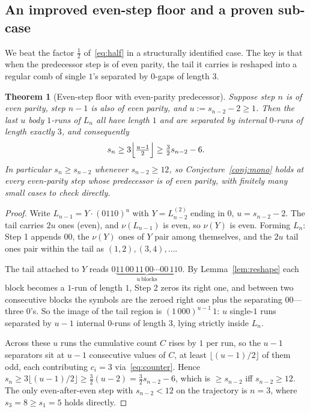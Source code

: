 \documentclass[11pt,reqno]{amsart}
\theoremstyle{plain}
\newtheorem{thm}[theorem]{Theorem}
\theoremstyle{definition}
\theoremstyle{remark}
\begin{document}
\subsection{An improved even-step floor and a proven sub-case}\label{sec:7.1}
We beat the factor $\tfrac12$ of~\eqref{eq:half} in a structurally identified case. The key is that when the predecessor step is of even parity, the tail it carries is reshaped into a regular comb of single $1$'s separated by $0$-gaps of length $3$.

\begin{thm}[Even-step floor with even-parity predecessor]\label{thm:floor}
Suppose step $n$ is of even parity, step $n-1$ is also of even parity, and $u:=s_{n-2}-2\ge 1$. Then the last $u$ body $1$-runs of $L_n$ all have length $1$ and are separated by internal $0$-runs of length exactly $3$, and consequently
\begin{equation}\label{eq:floor}
s_n\ge 3\Bigl\lfloor\tfrac{u-1}{2}\Bigr\rfloor\ge\tfrac32 s_{n-2}-6.
\end{equation}
In particular $s_n\ge s_{n-2}$ whenever $s_{n-2}\ge 12$, so Conjecture~\ref{conj:mono} holds at every even-parity step whose predecessor is of even parity, with finitely many small cases to check directly.
\end{thm}
\begin{proof}
Write $L_{n-1}=Y\cdot(0110)^u$ with $Y=L^{(2)}_{n-2}$ ending in $0$, $u=s_{n-2}-2$. The tail carries $2u$ ones (even), and $\nu(L_{n-1})$ is even, so $\nu(Y)$ is even. Forming $L_n$: Step 1 appends $00$, the $\nu(Y)$ ones of $Y$ pair among themselves, and the $2u$ tail ones pair within the tail as $(1,2),(3,4),\dots$.

The tail attached to $Y$ reads $0\underbrace{11\,00\,11\,00\cdots 00\,11}_{u\ \text{blocks}}0$. By Lemma~\ref{lem:reshape} each block becomes a $1$-run of length $1$, Step 2 zeros its right one, and between two consecutive blocks the symbols are the zeroed right one plus the separating $00$---three $0$'s. So the image of the tail region is $(1\,000)^{u-1}\,1$: $u$ single-$1$ runs separated by $u-1$ internal $0$-runs of length $3$, lying strictly inside $L_n$.

Across these $u$ runs the cumulative count $C$ rises by $1$ per run, so the $u-1$ separators sit at $u-1$ consecutive values of $C$, at least $\lfloor(u-1)/2\rfloor$ of them odd, each contributing $c_i=3$ via~\eqref{eq:counter}. Hence $s_n\ge 3\lfloor(u-1)/2\rfloor\ge\tfrac32(u-2)=\tfrac32 s_{n-2}-6$, which is $\ge s_{n-2}$ iff $s_{n-2}\ge 12$. The only even-after-even step with $s_{n-2}<12$ on the trajectory is $n=3$, where $s_3=8\ge s_1=5$ holds directly.
\end{proof}
\end{document}

